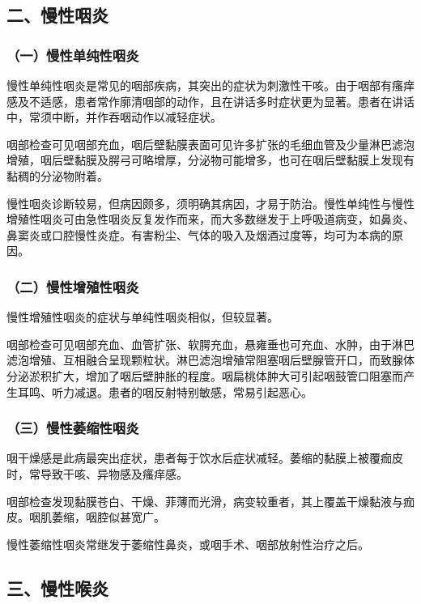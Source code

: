 \subsection{二、慢性咽炎}

\subsubsection{（一）慢性单纯性咽炎}

慢性单纯性咽炎是常见的咽部疾病，其突出的症状为刺激性干咳。由于咽部有瘙痒感及不适感，患者常作廓清咽部的动作，且在讲话多时症状更为显著。患者在讲话中，常须中断，并作吞咽动作以减轻症状。

咽部检查可见咽部充血，咽后壁黏膜表面可见许多扩张的毛细血管及少量淋巴滤泡增殖，咽后壁黏膜及腭弓可略增厚，分泌物可能增多，也可在咽后壁黏膜上发现有黏稠的分泌物附着。

慢性咽炎诊断较易，但病因颇多，须明确其病因，才易于防治。慢性单纯性与慢性增殖性咽炎可由急性咽炎反复发作而来，而大多数继发于上呼吸道病变，如鼻炎、鼻窦炎或口腔慢性炎症。有害粉尘、气体的吸入及烟酒过度等，均可为本病的原因。

\subsubsection{（二）慢性增殖性咽炎}

慢性增殖性咽炎的症状与单纯性咽炎相似，但较显著。

咽部检查可见咽部充血、血管扩张、软腭充血，悬雍垂也可充血、水肿，由于淋巴滤泡增殖、互相融合呈现颗粒状。淋巴滤泡增殖常阻塞咽后壁腺管开口，而致腺体分泌淤积扩大，增加了咽后壁肿胀的程度。咽扁桃体肿大可引起咽鼓管口阻塞而产生耳鸣、听力减退。患者的咽反射特别敏感，常易引起恶心。

\subsubsection{（三）慢性萎缩性咽炎}

咽干燥感是此病最突出症状，患者每于饮水后症状减轻。萎缩的黏膜上被覆痂皮时，常导致干咳、异物感及瘙痒感。

咽部检查发现黏膜苍白、干燥、菲薄而光滑，病变较重者，其上覆盖干燥黏液与痂皮。咽肌萎缩，咽腔似甚宽广。

慢性萎缩性咽炎常继发于萎缩性鼻炎，或咽手术、咽部放射性治疗之后。

\subsection{三、慢性喉炎}

